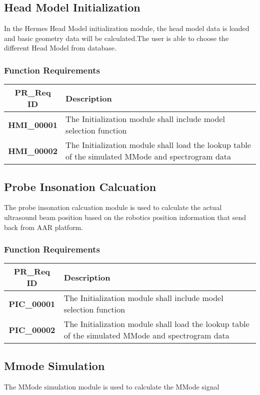 \documentclass[10pt]{article}
\begin{document}
  \subsection{Head Model Initialization}
  In the Hermes Head Model initialization module, the head model data is loaded and basic geometry data will be calculated.The user is able to choose the different Head Model from database.
  
  \subsubsection{Function Requirements}
  \begin{tabularx}{\textwidth}{|c|X|}
    \hline
    \textbf{PR\_Req ID} &\textbf{Description} \\ \hline
    \textbf{HMI\_00001} & The Initialization module shall include model selection function \\ \hline
    \textbf{HMI\_00002} & The Initialization module shall load the lookup table of the simulated MMode and spectrogram data \\ \hline
 \end{tabularx} \par
  
  \subsection{Probe Insonation Calcuation}
  The probe insonation calcuation module is used to calculate the actual ultrasound beam position based on the robotics position information that send back from AAR platform.
  \subsubsection{Function Requirements}
    \begin{tabularx}{\textwidth}{|c|X|}
    \hline
    \textbf{PR\_Req ID} &\textbf{Description} \\ \hline
    \textbf{PIC\_00001} & The Initialization module shall include model selection function \\ \hline
    \textbf{PIC\_00002} & The Initialization module shall load the lookup table of the simulated MMode and spectrogram data \\ \hline
 \end{tabularx} \par
 
  \subsection{Mmode Simulation}
  The MMode simulation module is used to calculate the MMode signal 
\end{document}
